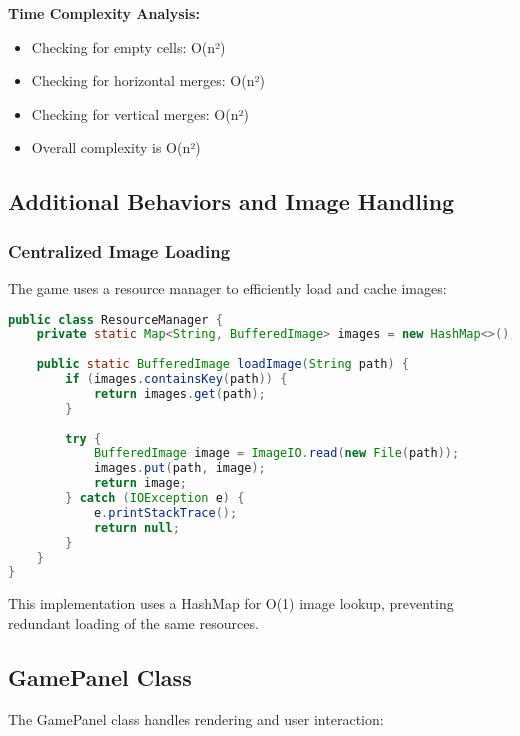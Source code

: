\documentclass[12pt, a4paper]{article}
\begin{document}
\textbf{Time Complexity Analysis:}
\begin{itemize}
    \item Checking for empty cells: O(n²)
    \item Checking for horizontal merges: O(n²)
    \item Checking for vertical merges: O(n²)
    \item Overall complexity is O(n²)
\end{itemize}

\subsection{Additional Behaviors and Image Handling}

\subsubsection{Centralized Image Loading}
The game uses a resource manager to efficiently load and cache images:

\begin{lstlisting}[language=Java, caption=Image Resource Manager]
public class ResourceManager {
    private static Map<String, BufferedImage> images = new HashMap<>();
    
    public static BufferedImage loadImage(String path) {
        if (images.containsKey(path)) {
            return images.get(path);
        }
        
        try {
            BufferedImage image = ImageIO.read(new File(path));
            images.put(path, image);
            return image;
        } catch (IOException e) {
            e.printStackTrace();
            return null;
        }
    }
}
\end{lstlisting}

This implementation uses a HashMap for O(1) image lookup, preventing redundant loading of the same resources.

\subsection{GamePanel Class}
The GamePanel class handles rendering and user interaction:
\end{document}
